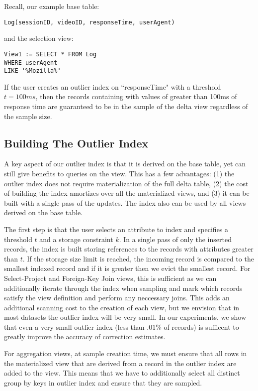 Recall, our example base table:
\begin{lstlisting}
Log(sessionID, videoID, responseTime, userAgent)
\end{lstlisting}
and the selection view:
\begin{lstlisting}
View1 := SELECT * FROM Log 
WHERE userAgent 
LIKE '%Mozilla%'
\end{lstlisting}
If the user creates an outlier index on ``responseTime" with a threshold $t=100ms$, then
the records containing with values of greater than 100ms of response time are guaranteed to be 
in the sample of the delta view regardless of the sample size.

\subsection{Building The Outlier Index}
A key aspect of our outlier index is that it is derived on the base table, yet 
can still give benefits to queries on the view.
This has a few advantages: (1) the outlier index does not require materialization of the full delta table,
(2) the cost of building the index amortizes over all the materialized views, and (3) it can be built with a 
single pass of the updates.
The index also can be used by all views derived on the base table.

The first step is that the user selects an attribute to index and specifies a threshold $t$ and a storage constraint $k$.
In a single pass of only the inserted records, the index is built storing references to the records with attributes greater than $t$.
If the storage size limit is reached, the incoming record is compared to the smallest indexed record and if it is greater then we evict the smallest record.
For Select-Project and Foreign-Key Join views, this is sufficient as we can additionally iterate through the index when sampling and mark 
which records satisfy the view definition and perform any neccessary joins. 
This adds an additional scanning cost to the creation of each view, but we envision that in most datasets the outlier index will be
very small.
In our experiments, we show that even a very small outlier index (less than .01\% of records) is sufficent to greatly improve the accuracy of
correction estimates.

For aggregation views, at sample creation time, we must ensure that all rows in the materialized view that are derived from a record in the outlier index are added to the view. 
This means that we have to additionally select all distinct group by keys in outlier index and ensure that they are sampled.

